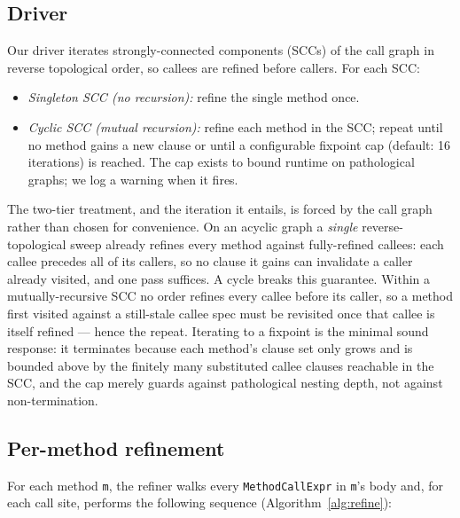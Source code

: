 \subsection{Driver}

Our driver iterates strongly-connected components (SCCs) of the call graph in reverse topological order, so callees are refined before callers. For each SCC:

\begin{itemize}\setlength\itemsep{0.2em}
  \item \emph{Singleton SCC (no recursion):} refine the single method
        once.
  \item \emph{Cyclic SCC (mutual recursion):} refine each method in
        the SCC; repeat until no method gains a new clause or until
        a configurable fixpoint cap (default: 16 iterations) is
        reached. The cap exists to bound runtime on pathological
        graphs; we log a warning when it fires.
\end{itemize}

The two-tier treatment, and the iteration it entails, is forced by
the call graph rather than chosen for convenience. On an acyclic graph
a \emph{single} reverse-topological sweep already refines every method
against fully-refined callees: each callee precedes all of its callers,
so no clause it gains can invalidate a caller already visited, and one
pass suffices. A cycle breaks this guarantee. Within a mutually-recursive
SCC no order refines every callee before its caller, so a method first
visited against a still-stale callee spec must be revisited once that
callee is itself refined --- hence the repeat. Iterating to a fixpoint
is the minimal sound response: it terminates because each method's
clause set only grows and is bounded above by the finitely many
substituted callee clauses reachable in the SCC, and the cap merely
guards against pathological nesting depth, not against non-termination.

\subsection{Per-method refinement}

For each method \texttt{m}, the refiner walks every
\texttt{MethodCallExpr} in \texttt{m}'s body and, for each call site,
performs the following sequence (Algorithm~\ref{alg:refine}):

